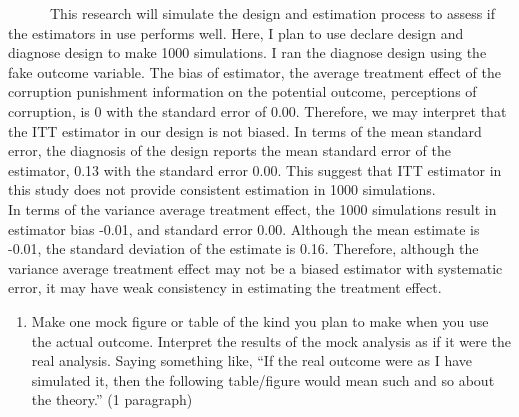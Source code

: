 \documentclass[
  11pt,
]{article}
\providecommand{\tightlist}{%
  \setlength{\itemsep}{0pt}\setlength{\parskip}{0pt}}
\begin{document}
~~~~~~This research will simulate the design and estimation process to
assess if the estimators in use performs well. Here, I plan to use
declare design and diagnose design to make 1000 simulations. I ran the
diagnose design using the fake outcome variable. The bias of estimator,
the average treatment effect of the corruption punishment information on
the potential outcome, perceptions of corruption, is 0 with the standard
error of 0.00. Therefore, we may interpret that the ITT estimator in our
design is not biased. In terms of the mean standard error, the diagnosis
of the design reports the mean standard error of the estimator, 0.13
with the standard error 0.00. This suggest that ITT estimator in this
study does not provide consistent estimation in 1000 simulations.\\
\hspace*{0.333em}\hspace*{0.333em}\hspace*{0.333em}\hspace*{0.333em}\hspace*{0.333em}\hspace*{0.333em}In
terms of the variance average treatment effect, the 1000 simulations
result in estimator bias -0.01, and standard error 0.00. Although the
mean estimate is -0.01, the standard deviation of the estimate is 0.16.
Therefore, although the variance average treatment effect may not be a
biased estimator with systematic error, it may have weak consistency in
estimating the treatment effect.

\begin{enumerate}
\def\labelenumi{\arabic{enumi}.}
\setcounter{enumi}{13}
\tightlist
\item
  Make one mock figure or table of the kind you plan to make when you
  use the actual outcome. Interpret the results of the mock analysis as
  if it were the real analysis. Saying something like, ``If the real
  outcome were as I have simulated it, then the following table/figure
  would mean such and so about the theory.'' (1 paragraph)
\end{enumerate}
\end{document}
